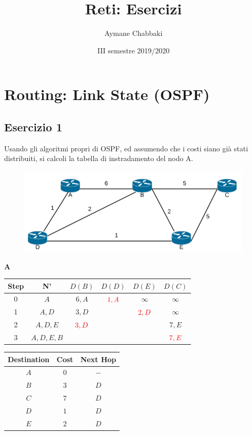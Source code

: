 \documentclass[10pt]{article}
\title{Reti: Esercizi}
\author{Aymane Chabbaki}
\date{III semestre 2019/2020}
\begin{document}
	\maketitle
	\tableofcontents
	\newpage
	
	\section{Routing: Link State (OSPF)}
		\subsection{Esercizio 1}
			Usando gli algoritmi propri di OSPF, ed assumendo che i costi siano già stati distribuiti, si calcoli la tabella di instradamento del nodo A.
			\begin{figure}[h]
				\centering
				\includegraphics[width=13cm]{es1}
			\end{figure}
			\begin{center}
				\textbf{A}
				\begin{tabular}{||c c c c c c||} 
					\hline
					Step & N' & $D(B)$ & $D(D)$ & $D(E)$ & $D(C)$ \\[0.5ex] 
					\hline\hline
					0 & $A$ & $6,A$ & $\color{red} 1,A$ & $\infty$ & $\infty$ \\ 
					\hline
					1 & $A,D$ & $3,D$ &   & $\color{red}2,D$ & $\infty$ \\
					\hline
					2 & $A,D,E$ & $\color{red}3,D$ &   &   & $7,E$ \\
					\hline
					3 & $A,D,E,B$ &   &   &   & $\color{red}7,E$ \\[0.5ex] 
					\hline
				\end{tabular}
				\quad
				\begin{tabular}{||c || c || c||}
					\hline
					Destination & Cost & Next Hop \\ [0.5ex] 
					\hline\hline
					$A$ & $0$ & $-$ \\
					$B$ & $3$ & $D$ \\
					$C$ & $7$ & $D$ \\
					$D$ & $1$ & $D$ \\
					$E$ & $2$ & $D$ \\[0.5ex] 
					\hline
				\end{tabular}
			\end{center}
		
\end{document}
